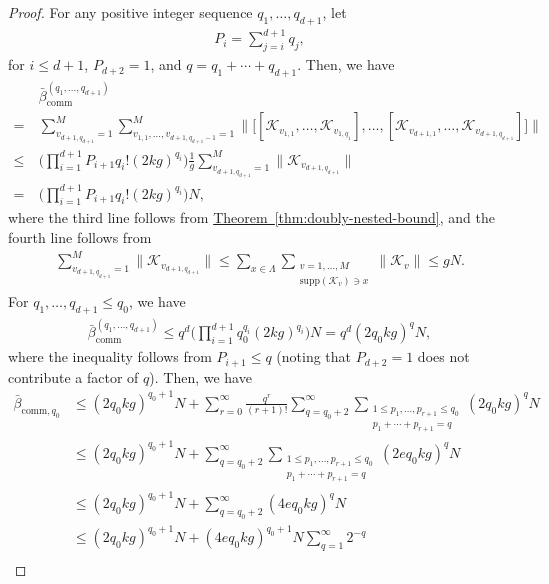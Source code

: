 \documentclass[11pt]{article}
\newcommand{\thm}[1]{\hyperref[thm:#1]{Theorem~\ref*{thm:#1}}}
\renewcommand{\comm}{\mathrm{comm}}
\newcommand{\supp}{\mathrm{supp}}
\newcommand{\mc}{\mathcal}
\begin{document}
\begin{proof} 
    For any positive integer sequence $q_1, \ldots, q_{d+1}$, let 
    \begin{align*}
        P_{i} = \sum_{j=i}^{d+1} q_j,
    \end{align*}
    for $i\le d+1$, $P_{d+2} = 1$, and $q = q_1+\cdots+q_{d+1}$. Then, we have 
    \begin{align*}
    &\bar{\beta}_{\comm}^{(q_1, \ldots, q_{d+1})}\\
    =~& \sum_{v_{d+1, q_{d+1}}=1}^{M} \sum_{v_{1,1}, \ldots, v_{d+1, q_{d+1}-1} = 1}^M \bigg\| \Big[ 
         [\mc K_{v_{1,1}}, \ldots, \mc K_{v_{1,q_1}}], \ldots, 
        [\mc K_{v_{d+1,1}}, \ldots, \mc K_{v_{d+1,q_{d+1}}}]
     \Big] \bigg\| \\
    \le~& \bigg(\prod_{i=1}^{d+1}P_{i+1}q_i!(2kg)^{q_i }\bigg)\frac{1}{g}\sum_{v_{d+1, q_{d+1}}=1}^{M} \|\mc K_{v_{d+1, q_{d+1}}}\|\\
    =~&  \bigg(\prod_{i=1}^{d+1}P_{i+1}q_i!(2kg)^{q_i }\bigg)N,
\end{align*}
where the third line follows from \thm{doubly-nested-bound}, and the fourth line follows from 
\begin{align*}
    \sum_{v_{d+1,q_{d+1}}=1}^{M}\|\mc K_{v_{d+1, q_{d+1}}}\|\le \sum_{x\in\Lambda}\sum_{\substack{v = 1, \ldots, M \\ \supp(\mc K_v)\ni x}} \|\mc K_{v}\|\le gN.
\end{align*}
For $q_1, \ldots, q_{d+1}\le q_0$, we have 
\begin{align*}
    \bar{\beta}_{\comm}^{(q_1, \ldots, q_{d+1})}\le q^{d}\bigg(\prod_{i=1}^{d+1}q_0^{q_{i}}(2kg)^{q_i }\bigg)N = q^{d} (2q_0kg)^q N,
\end{align*}
where the inequality follows from $P_{i+1}\le q$ (noting that $P_{d+2} = 1$ does not contribute a factor of $q$). 
Then, we have 
\begin{align*}
    \bar{\beta}_{\comm,q_0} &\le (2q_0 kg)^{q_0+1} N+ \sum_{r = 0}^{\infty}\frac{q^{r} }{(r+1)!} \sum_{q=q_0+2}^{\infty}\sum_{\substack{1\le p_1, \ldots, p_{r+1}\le q_0\\p_1+\cdots+p_{r+1} = q}}(2q_0 kg)^q N \\ 
    &\le  (2q_0 kg)^{q_0+1} N+  \sum_{q=q_0+2}^{\infty}\sum_{\substack{1\le p_1, \ldots, p_{r+1}\le q_0\\p_1+\cdots+p_{r+1} = q}} (2eq_0 kg)^q N\\
    &\le(2q_0 kg)^{q_0+1} N+  \sum_{q=q_0+2}^{\infty} (4eq_0 kg)^q N   \\
    &\le (2q_0kg)^{q_0+1} N + (4eq_0 kg)^{q_0+1} N \sum_{q = 1}^{\infty} 2^{-q} \\

\end{align*}
\end{proof}
\end{document}

